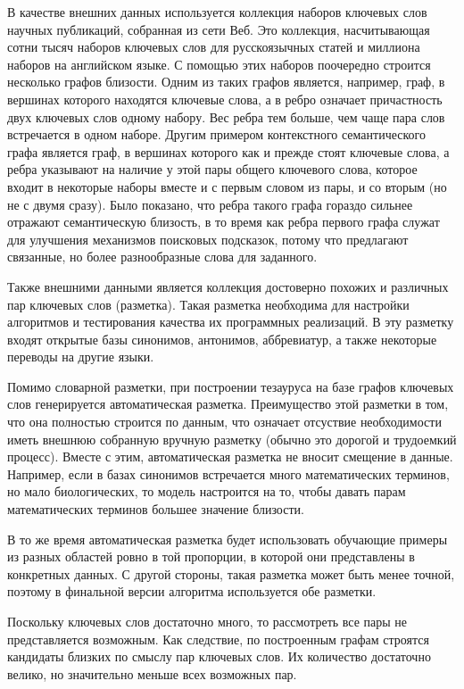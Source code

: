 В качестве внешних данных используется коллекция наборов ключевых слов научных публикаций, собранная из сети Веб. Это коллекция, насчитывающая сотни тысяч наборов ключевых слов для русскоязычных статей и миллиона наборов на английском языке. С помощью этих наборов поочередно строится несколько графов близости. Одним из таких графов является, например, граф, в вершинах которого находятся ключевые слова, а в ребро означает причастность двух ключевых слов одному набору. Вес ребра тем больше, чем чаще пара слов встречается в одном наборе. Другим примером контекстного семантического графа является граф, в вершинах которого как и прежде стоят ключевые слова, а ребра указывают на наличие у этой пары общего ключевого слова, которое входит в некоторые наборы вместе и с первым словом из пары, и со вторым (но не с двумя сразу). Было показано, что ребра такого графа гораздо сильнее отражают семантическую близость, в то время как ребра первого графа служат для улучшения механизмов поисковых подсказок, потому что предлагают связанные, но более разнообразные слова для заданного.


Также внешними данными является коллекция достоверно похожих и различных пар ключевых слов (разметка). Такая разметка необходима для настройки алгоритмов и тестирования качества их программных реализаций. В эту разметку входят открытые базы синонимов, антонимов, аббревиатур, а также некоторые переводы на другие языки.

Помимо словарной разметки, при построении тезауруса на базе графов ключевых слов генерируется автоматическая разметка. Преимущество этой разметки в том, что она полностью строится по данным, что означает отсуствие необходимости иметь внешнюю собранную вручную разметку (обычно это дорогой и трудоемкий процесс). Вместе с этим, автоматическая разметка не вносит смещение в данные. Например, если в базах синонимов встречается много математических терминов, но мало биологических, то модель настроится на то, чтобы давать парам математических терминов большее значение близости. 

В то же время автоматическая разметка будет использовать обучающие примеры из разных областей ровно в той пропорции, в которой они представлены в конкретных данных. С другой стороны, такая разметка может быть менее точной, поэтому в финальной версии алгоритма используется обе разметки.

Поскольку ключевых слов достаточно много, то рассмотреть все пары не представляется возможным. Как следствие, по построенным графам строятся кандидаты близких по смыслу пар ключевых слов. Их количество достаточно велико, но значительно меньше всех возможных пар.

